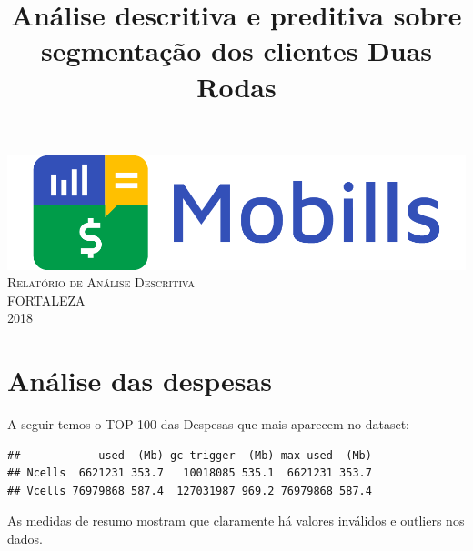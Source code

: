 \documentclass[12pt,a4paper]{article}\usepackage[]{graphicx}\usepackage[]{color}
\title{Análise descritiva e preditiva sobre \\ segmentação dos clientes Duas Rodas}
\makeatletter
\newenvironment{kframe}{%
 \def\at@end@of@kframe{}%
 \ifinner\ifhmode%
  \def\at@end@of@kframe{\end{minipage}}%
  \begin{minipage}{\columnwidth}%
 \fi\fi%
 \def\FrameCommand##1{\hskip\@totalleftmargin \hskip-\fboxsep
 \colorbox{shadecolor}{##1}\hskip-\fboxsep
     \hskip-\linewidth \hskip-\@totalleftmargin \hskip\columnwidth}%
 \MakeFramed {\advance\hsize-\width
   \@totalleftmargin\z@ \linewidth\hsize
   \@setminipage}}%
 {\par\unskip\endMakeFramed%
 \at@end@of@kframe}
\newenvironment{knitrout}{}{} %
\makeatother
\begin{document}
\begin{titlepage}
\begin{center}
\begin{minipage}{5in}
\begin{center}
\hspace{-1cm}
\includegraphics[scale=0.23]{figure/logo.png}
\vspace{3.5cm}\\
{\large \scshape Relatório de Análise Descritiva}\\
\vspace{14cm}
{\hspace{1cm}
{\Large FORTALEZA \\ \hspace{1cm} 2018}}
\end{center}
\thispagestyle{empty}
\end{minipage}
\end{center}
\end{titlepage}

\newpage
\section{Análise das despesas}
A seguir temos o TOP 100 das Despesas que mais aparecem no dataset: 



\begin{knitrout}\small
{}\color{fgcolor}\begin{kframe}
\begin{verbatim}
##            used  (Mb) gc trigger  (Mb) max used  (Mb)
## Ncells  6621231 353.7   10018085 535.1  6621231 353.7
## Vcells 76979868 587.4  127031987 969.2 76979868 587.4
\end{verbatim}
\end{kframe}
\end{knitrout}
As medidas de resumo mostram que claramente há valores inválidos e outliers nos dados.
\end{document}
